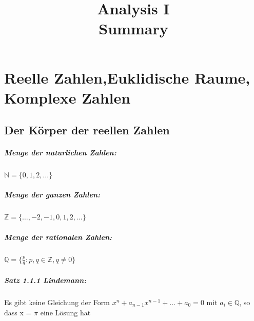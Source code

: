 \documentclass[8pt]{extreport}
\title{Analysis I\\ Summary}
\begin{document}
	\maketitle
	\newpage
\chapter{Reelle Zahlen,Euklidische Raume, Komplexe Zahlen}
\section{Der Körper der reellen Zahlen}
\paragraph{Menge der naturlichen Zahlen:} $\mathbb{N} = \{0,1,2,\dots\}$
\paragraph{Menge der ganzen Zahlen:} $\mathbb{Z} = \{\dots,-2,-1,0,1,2,\dots\}$
\paragraph{Menge der rationalen Zahlen:} $\mathbb{Q} = \bigg\{\frac{p}{q}: p,q\in\mathbb{Z}, q\neq 0\bigg\}$
\paragraph{Satz 1.1.1 Lindemann:\\} Es gibt keine Gleichung der Form $x^n + a_{n-1}x^{n-1}+\dots + a_{0} = 0$ mit $a_{i}\in \mathbb{Q}$, so dass x = $\pi$ eine Lösung hat
\end{document}
